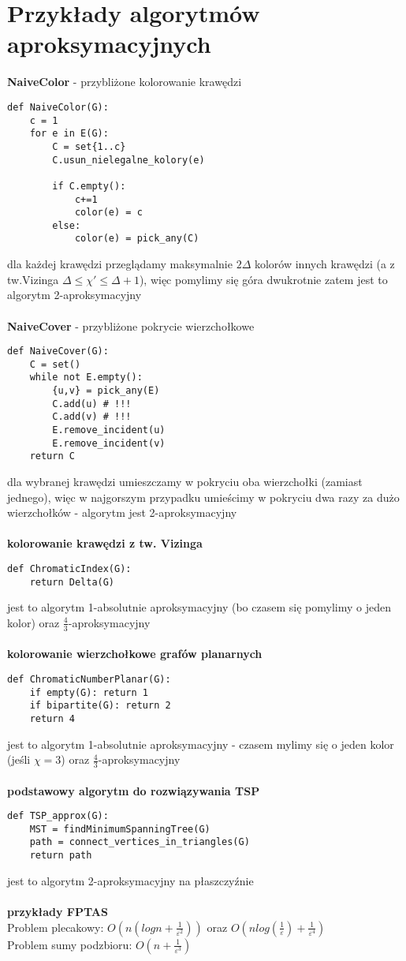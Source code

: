 \documentclass{article}
\begin{document}
\section{Przykłady algorytmów aproksymacyjnych}

\textbf{NaiveColor} - przybliżone kolorowanie krawędzi
\begin{lstlisting}
def NaiveColor(G):
	c = 1
	for e in E(G):
		C = set{1..c}
		C.usun_nielegalne_kolory(e)

		if C.empty():
			c+=1
			color(e) = c
		else:	
			color(e) = pick_any(C)
\end{lstlisting}
dla każdej krawędzi przeglądamy maksymalnie $2\Delta$ kolorów innych krawędzi (a z tw.Vizinga $\Delta \leq \chi' \leq \Delta + 1$), więc pomylimy się góra dwukrotnie zatem jest to algorytm 2-aproksymacyjny \\\\
\textbf{NaiveCover} - przybliżone pokrycie wierzchołkowe
\begin{lstlisting}
def NaiveCover(G):
	C = set()
	while not E.empty():
		{u,v} = pick_any(E)		
		C.add(u) # !!!
		C.add(v) # !!!
		E.remove_incident(u)
		E.remove_incident(v)
	return C
\end{lstlisting}
dla wybranej krawędzi umieszczamy w pokryciu oba wierzchołki (zamiast jednego), więc w najgorszym przypadku umieścimy w pokryciu dwa razy za dużo wierzchołków - algorytm jest 2-aproksymacyjny\\\\
\textbf{kolorowanie krawędzi z tw. Vizinga}
\begin{lstlisting}
def ChromaticIndex(G):
	return Delta(G)
\end{lstlisting}
jest to algorytm 1-absolutnie aproksymacyjny (bo czasem się pomylimy o jeden kolor) oraz $\frac{4}{3}$-aproksymacyjny \\\\
\textbf{kolorowanie wierzchołkowe grafów planarnych}
\begin{lstlisting}
def ChromaticNumberPlanar(G):
	if empty(G): return 1
	if bipartite(G): return 2
	return 4
\end{lstlisting}
jest to algorytm 1-absolutnie aproksymacyjny - czasem mylimy się o jeden kolor (jeśli $\chi = 3$) oraz $\frac{4}{3}$-aproksymacyjny \\\\

\textbf{podstawowy algorytm do rozwiązywania TSP}

\begin{lstlisting}
def TSP_approx(G):
	MST = findMinimumSpanningTree(G)
	path = connect_vertices_in_triangles(G)
	return path
\end{lstlisting}
jest to algorytm 2-aproksymacyjny na płaszczyźnie \\\\
\textbf{przykłady FPTAS} \\
Problem plecakowy: $O(n(logn + \frac{1}{\varepsilon^2}))$ oraz $O(nlog(\frac{1}{\varepsilon}) + \frac{1}{\varepsilon^4} )$ \\
Problem sumy podzbioru: $O(n + \frac{1}{\varepsilon^3})$ \\\\
\end{document}
